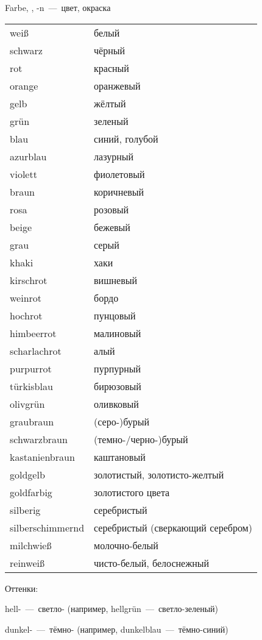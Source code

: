 
 Farbe, \Fall{=}, -n~---~цвет, окраска

\begin{longtable}{|ll|}
\hline
wei\ss & белый \\
schwarz & чёрный \\
rot & красный \\
orange & оранжевый \\
gelb & жёлтый \\
gr\"un & зеленый \\
blau & синий, голубой \\
azurblau & лазурный \\
violett & фиолетовый \\
braun & коричневый \\
rosa & розовый \\
beige & бежевый \\
grau & серый \\
khaki & хаки \\
kirschrot & вишневый \\
weinrot & бордо \\
hochrot & пунцовый \\
himbeerrot & малиновый \\
scharlachrot & алый \\
purpurrot & пурпурный \\
t\"urkisblau & бирюзовый \\
olivgr\"un & оливковый \\
graubraun & (серо-)бурый \\
schwarzbraun & (темно-/черно-)бурый \\
kastanienbraun & каштановый \\
goldgelb & золотистый, золотисто-желтый \\
goldfarbig & золотистого цвета \\
silberig & серебристый \\
silberschimmernd & серебристый (сверкающий серебром) \\
milchwie\ss & молочно-белый \\
reinwei\ss & чисто-белый, белоснежный \\
\hline
\end{longtable}

Оттенки:

hell-~---~светло- (например, hellgr\"un~---~светло-зеленый)

dunkel-~---~тёмно- (например, dunkelblau~---~тёмно-синий)

